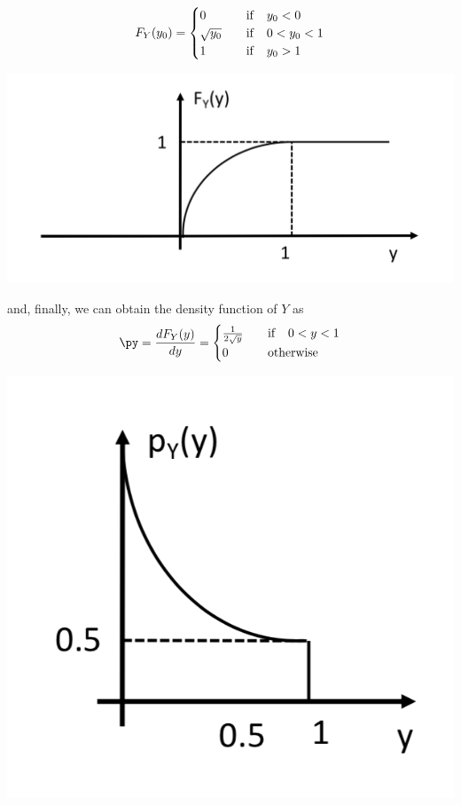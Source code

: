 \begin{eqnarray} 
F_Y(y_0) =\begin{cases}
 0 & \quad {\rm if} \quad y_0 <0 \\
 \sqrt{y_0} & \quad {\rm if} \quad 0< y_0 <1 \\
 1 & \quad {\rm if} \quad y_0 >1 \\
\end{cases}  \nonumber
\end{eqnarray} 
\begin{center}
\includegraphics[scale=.4]{Figures/Fig13.png}
\end{center}
and, finally, we can obtain the density function of $Y$ as
\begin{eqnarray} 
\py = \frac{d F_Y(y)}{dy} =\begin{cases}
 \frac{1}{2\sqrt{y}} & \quad {\rm if} \quad 0<y<1 \\
 0 & \quad {\rm otherwise}  \\
\end{cases}  \nonumber
\end{eqnarray} 
\begin{center}
\includegraphics[scale=.4]{Figures/Fig14.png}
\end{center}
